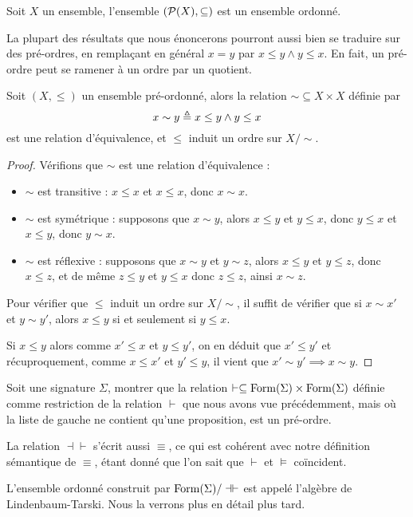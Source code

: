 \begin{example}
  Soit $X$ un ensemble, l'ensemble $(\mathcal{P}(X),\subseteq)$ est un ensemble
  ordonné.
\end{example}

La plupart des résultats que nous énoncerons pourront aussi bien se traduire sur
des pré-ordres, en remplaçant en général $x = y$ par $x\leq y \land y \leq x$.
En fait, un pré-ordre peut se ramener à un ordre par un quotient.

\begin{property}
  Soit $(X,\leq)$ un ensemble pré-ordonné, alors la relation
  $\sim\subseteq X \times X$ définie par
  \[x\sim y \triangleq x\leq y \land y \leq x\]
  est une relation d'équivalence, et $\leq$ induit un ordre sur $X/\sim$.
\end{property}

\begin{proof}
  Vérifions que $\sim$ est une relation d'équivalence :
  \begin{itemize}
  \item $\sim$ est transitive : $x\leq x$ et $x\leq x$, donc $x\sim x$.
  \item $\sim$ est symétrique : supposons que $x\sim y$, alors $x\leq y$ et
    $y\leq x$, donc $y\leq x$ et $x\leq y$, donc $y\sim x$.
  \item $\sim$ est réflexive : supposons que $x\sim y$ et $y\sim z$, alors
    $x\leq y$ et $y\leq z$, donc $x\leq z$, et de même $z\leq y$ et $y\leq x$
    donc $z\leq z$, ainsi $x\sim z$.
  \end{itemize}

  Pour vérifier que $\leq$ induit un ordre sur $X/\sim$, il suffit de vérifier
  que si $x\sim x'$ et $y\sim y'$, alors $x\leq y$ si et seulement si $y\leq x$.

  Si $x\leq y$ alors comme $x'\leq x$ et $y\leq y'$, on en déduit que $x'\leq y'$
  et récuproquement, comme $x\leq x'$ et $y'\leq y$, il vient que
  $x'\sim y'\implies x\sim y$.
\end{proof}

\begin{exercise}
  Soit une signature $\Sigma$, montrer que la relation
  $\vdash\subseteq\operatorname{Form}(\Sigma)\times\operatorname{Form}(\Sigma)$ définie comme
  restriction de la relation $\vdash$ que nous avons vue précédemment, mais où
  la liste de gauche ne contient qu'une proposition, est un pré-ordre.
\end{exercise}

\begin{remark}
  La relation $\dashv\vdash$ s'écrit aussi $\equiv$, ce qui est cohérent avec
  notre définition sémantique de $\equiv$, étant donné que l'on sait que
  $\vdash$ et $\vDash$ coïncident.

  L'ensemble ordonné construit par $\operatorname{Form}(\Sigma)/\dashv\vdash$ est appelé
  l'algèbre de Lindenbaum-Tarski. Nous la verrons plus en détail plus tard.
\end{remark}


